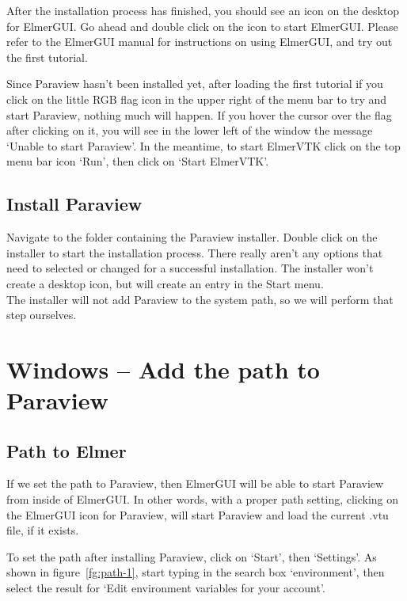 After the installation process has finished, you should see an icon on the desktop for ElmerGUI.  Go ahead and double click on the icon to start ElmerGUI.  Please refer to the ElmerGUI manual for instructions on using ElmerGUI, and try out the first tutorial. 

Since Paraview hasn't been installed yet, after loading the first tutorial  if you click on the little RGB flag icon in the upper right of the menu bar to try and start Paraview, nothing much will happen.  If you hover the cursor over the flag after clicking on it, you will see in the lower left of the window the message `Unable to start Paraview'.  In the meantime, to start ElmerVTK click on the top menu bar icon `Run', then click on `Start ElmerVTK'.


\section{Install Paraview}

Navigate to the folder containing the Paraview installer.  Double click on the installer to start the installation process.  There really aren't any options that need to selected or changed for a successful installation.  The installer won't create a desktop icon, but will create an entry in the Start menu.\\

The installer will not add Paraview to the system path, so we will perform that step ourselves.


\chapter{Windows -- Add the path to Paraview}

\section{Path to Elmer}

If we set the path to Paraview, then ElmerGUI will be able to start Paraview from inside of ElmerGUI.  In other words, with a proper path setting, clicking on the ElmerGUI icon for Paraview, will start Paraview and load the current .vtu file, if it exists.

To set the path after installing Paraview, click on `Start', then `Settings'.  As shown in figure~\ref{fg:path-1}, start typing in the search box `environment', then select the result for `Edit environment variables for your account'.  

